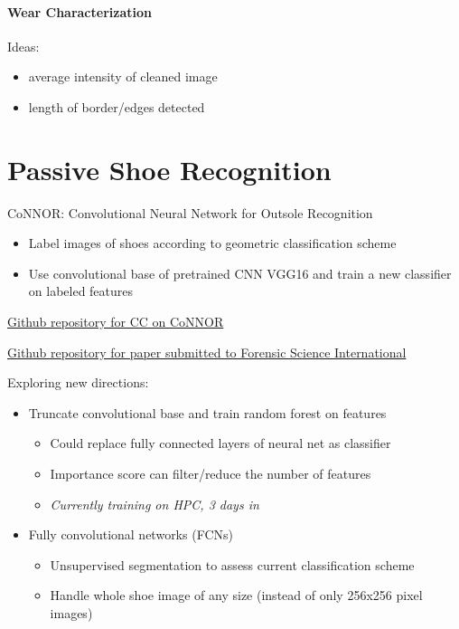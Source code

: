 \documentclass[]{book}
\providecommand{\tightlist}{%
  \setlength{\itemsep}{0pt}\setlength{\parskip}{0pt}}
\let\oldparagraph\paragraph
\renewcommand{\paragraph}[1]{\oldparagraph{#1}\mbox{}}
\begin{document}
\hypertarget{lss-paper-analysis-wear}{%
\paragraph{Wear Characterization}\label{lss-paper-analysis-wear}}

Ideas:

\begin{itemize}
\tightlist
\item
  average intensity of cleaned image
\item
  length of border/edges detected
\end{itemize}

\hypertarget{connor}{%
\section{Passive Shoe Recognition}\label{connor}}

CoNNOR: Convolutional Neural Network for Outsole Recognition

\begin{itemize}
\tightlist
\item
  Label images of shoes according to geometric classification scheme
\item
  Use convolutional base of pretrained CNN VGG16 and train a new classifier on labeled features
\end{itemize}

\href{https://github.com/MirandaTilton/ISU_CC}{Github repository for CC on CoNNOR}

\href{https://github.com/srvanderplas/CoNNORFSI}{Github repository for paper submitted to Forensic Science International}

Exploring new directions:

\begin{itemize}
\tightlist
\item
  Truncate convolutional base and train random forest on features

  \begin{itemize}
  \tightlist
  \item
    Could replace fully connected layers of neural net as classifier
  \item
    Importance score can filter/reduce the number of features
  \item
    \emph{Currently training on HPC, 3 days in}
  \end{itemize}
\item
  Fully convolutional networks (FCNs)

  \begin{itemize}
  \tightlist
  \item
    Unsupervised segmentation to assess current classification scheme
  \item
    Handle whole shoe image of any size (instead of only 256x256 pixel images)
  \end{itemize}
\end{itemize}
\end{document}
